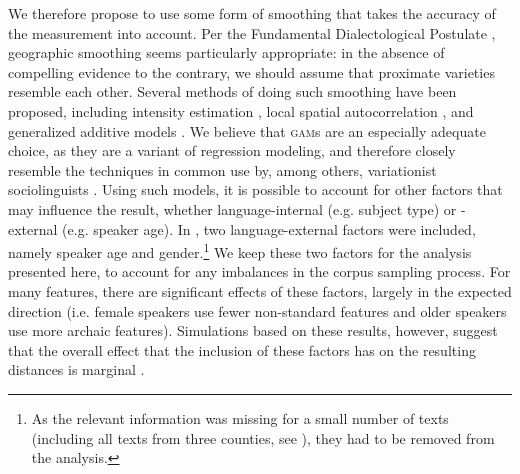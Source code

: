 \documentclass[output=paper]{LSP/langsci}
\begin{document}
We therefore propose to use some form of smoothing that takes the accuracy of the measurement into account.
Per the Fundamental Dialectological Postulate \citep{nerbonne_toward_2007}, geographic smoothing seems particularly appropriate: in the absence of compelling evidence to the contrary, we should assume that proximate varieties resemble each other.
Several methods of doing such smoothing have been proposed, including intensity estimation \citep{rumpf_structural_2009}, local spatial autocorrelation \citep{grieve_corpus-based_2009}, and generalized additive models \citep[\textsc{gam}s;][]{wieling_quantitative_2012}.
We believe that \textsc{gam}s are an especially adequate choice, as they are a variant of regression modeling, and therefore closely resemble the techniques in common use by, among others, variationist sociolinguists \citep{tagliamonte_variationist_2012}.
Using such models, it is possible to account for other factors that may influence the result, whether language-internal (e.g. subject type) or -external (e.g. speaker age).
In \citet{wolk_integrating_2014}, two language-external factors were included, namely speaker age and gender.\footnote{As the relevant information was missing for a small number of texts (including all texts from three counties, see ), they had to be removed from the analysis.}
We keep these two factors for the analysis presented here, to account for any imbalances in the corpus sampling process.
For many features, there are significant effects of these factors, largely in the expected direction (i.e. female speakers use fewer non-standard features and older speakers use more archaic features).
Simulations based on these results, however, suggest that the overall effect that the inclusion of these factors has on the resulting distances is marginal \citep[233f.]{wolk_integrating_2014}.
\end{document}

